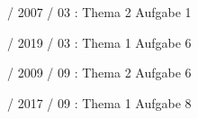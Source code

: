 \documentclass{lehramt-informatik-haupt}
\begin{document}
 / 2007 / 03 : Thema 2 Aufgabe 1

%

 / 2019 / 03 : Thema 1 Aufgabe 6

%

 / 2009 / 09 : Thema 2 Aufgabe 6

%

 / 2017 / 09 : Thema 1 Aufgabe 8

\literatur
\end{document}

